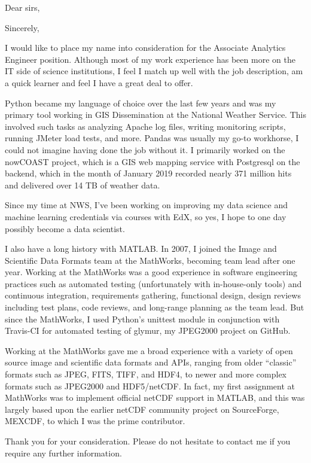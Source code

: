 \documentclass[11pt]{moderncv}  %
\begin{document}
\opening{Dear sirs,}
\closing{Sincerely,}


\makelettertitle

I would like to place my name into consideration for the Associate Analytics Engineer position.  Although most of my work experience has been more on the IT side of science institutions, I feel I match up well with the job description, am a quick learner and feel I have a great deal to offer.

Python became my language of choice over the last few years and was my primary tool working in GIS Dissemination at the National Weather Service.  This involved such tasks as analyzing Apache log files, writing monitoring scripts, running JMeter load tests, and more.  Pandas was usually my go-to workhorse, I could not imagine having done the job without it.  I primarily worked on the nowCOAST project, which is a GIS web mapping service with Postgresql on the backend, which in the month of January 2019 recorded nearly 371 million hits and delivered over 14 TB of weather data.

Since my time at NWS, I've been working on improving my data science and machine learning credentials via courses with EdX, so yes, I hope to one day possibly become a data scientist.

I also have a long history with MATLAB.  In 2007, I joined the Image and Scientific Data Formats team at the MathWorks, becoming  team lead after one year.  Working at the MathWorks was a good experience in software engineering practices such as automated testing (unfortunately with in-house-only tools) and continuous integration, requirements gathering, functional design, design reviews including test plans, code reviews, and long-range planning as the team lead.   But since the MathWorks, I used Python's unittest module in conjunction with Travis-CI for automated testing of glymur, my JPEG2000 project on GitHub.

Working at the MathWorks gave me a broad experience with a variety of open source image and scientific data formats and APIs, ranging from older “classic” formats such as JPEG, FITS, TIFF, and HDF4, to newer and more complex formats such as JPEG2000 and HDF5/netCDF.  In fact, my first assignment at MathWorks was to implement official netCDF support in MATLAB, and this was largely based upon the earlier netCDF community project on SourceForge, MEXCDF, to which I was the prime contributor.   

Thank you for your consideration.  Please do not hesitate to contact me if you require any further information.

\makeletterclosing
\end{document}

